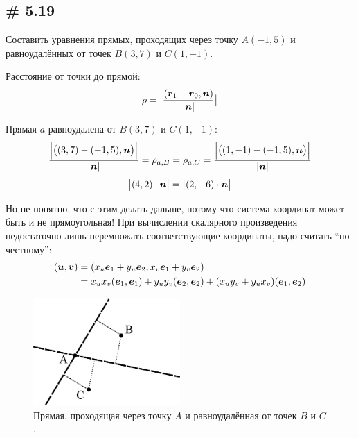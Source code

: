 \documentclass[a4paper,12pt]{article}
\begin{document}
  
  \subsection{\# 5.19}
  
  \begin{problem}
    Составить уравнения прямых, проходящих через точку $A(-1, 5)$ и равноудалённых от точек $B(3, 7)$ и $C(1, -1)$.
  \end{problem}
  
  \begin{solution}
    Расстояние от точки до прямой:
    \[
      \rho = \bigl|\frac{(\boldsymbol r_1 - \boldsymbol r_0, \boldsymbol n)}{|\boldsymbol n|}\bigr|
    \]
    
    Прямая $a$ равноудалена от $B(3, 7)$ и $C(1, -1)$:
    \[
      \frac{\Bigl|\bigl((3, 7) - (-1, 5), \boldsymbol n\bigr)\Bigr|}{|\boldsymbol n|} = \rho_{a, B}
      = \rho_{a, C}
      = \frac{\Bigl|\bigl((1, -1) - (-1, 5), \boldsymbol n\bigr)\Bigr|}{|\boldsymbol n|}
    \]
    \[
      \bigl|(4, 2) \cdot \boldsymbol n\bigr| = \bigl|(2, -6) \cdot \boldsymbol n\bigr|
    \]
    
    Но не понятно, что с этим делать дальше, потому что система координат может быть и не прямоугольная!
    При вычислении скалярного произведения недостаточно лишь перемножать соответствующие координаты, надо считать ``по-честному'':
    \begin{equation*}
    \begin{split}
      (\boldsymbol u, \boldsymbol v)
      &= (x_u \boldsymbol e_1 + y_u \boldsymbol e_2, x_v \boldsymbol e_1 + y_v \boldsymbol e_2)\\
      &= x_u x_v(\boldsymbol e_1, \boldsymbol e_1) + y_u y_v(\boldsymbol e_2, \boldsymbol e_2) + (x_u y_v + y_u x_v)(\boldsymbol e_1, \boldsymbol e_2)
    \end{split}
    \end{equation*}

    \begin{figure}[h]
      \centering
      
      \includegraphics[width=0.5\textwidth]{5-19}
      
      \caption{Прямая, проходящая через точку $A$ и равноудалённая от точек $B$ и $C$.}
      \label{fig:5-19}
    \end{figure}
    

\end{solution}
\end{document}
